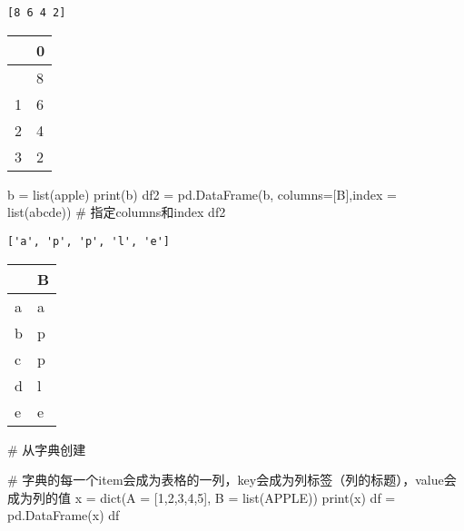 \documentclass[
  letterpaper,
  DIV=11,
  numbers=noendperiod]{scrreprt}
\newenvironment{Shaded}{\begin{snugshade}}{\end{snugshade}}
\newcommand{\BuiltInTok}[1]{\textcolor[rgb]{0.00,0.23,0.31}{#1}}
\newcommand{\CommentTok}[1]{\textcolor[rgb]{0.37,0.37,0.37}{#1}}
\newcommand{\DecValTok}[1]{\textcolor[rgb]{0.68,0.00,0.00}{#1}}
\newcommand{\NormalTok}[1]{\textcolor[rgb]{0.00,0.23,0.31}{#1}}
\newcommand{\OperatorTok}[1]{\textcolor[rgb]{0.37,0.37,0.37}{#1}}
\newcommand{\StringTok}[1]{\textcolor[rgb]{0.13,0.47,0.30}{#1}}
\begin{document}
\begin{verbatim}
[8 6 4 2]
\end{verbatim}

\begin{longtable}[]{@{}ll@{}}
\toprule\noalign{}
& 0 \\
\midrule\noalign{}
\endhead
\bottomrule\noalign{}
\endlastfoot
0 & 8 \\
1 & 6 \\
2 & 4 \\
3 & 2 \\
\end{longtable}

\begin{Shaded}
\begin{Highlighting}[]
\NormalTok{b }\OperatorTok{=} \BuiltInTok{list}\NormalTok{(}\StringTok{\textquotesingle{}apple\textquotesingle{}}\NormalTok{)}
\BuiltInTok{print}\NormalTok{(b)}
\NormalTok{df2 }\OperatorTok{=}\NormalTok{ pd.DataFrame(b, columns}\OperatorTok{=}\NormalTok{[}\StringTok{\textquotesingle{}B\textquotesingle{}}\NormalTok{],index }\OperatorTok{=} \BuiltInTok{list}\NormalTok{(}\StringTok{\textquotesingle{}abcde\textquotesingle{}}\NormalTok{)) }\CommentTok{\# 指定columns和index}
\NormalTok{df2}
\end{Highlighting}
\end{Shaded}

\begin{verbatim}
['a', 'p', 'p', 'l', 'e']
\end{verbatim}

\begin{longtable}[]{@{}ll@{}}
\toprule\noalign{}
& B \\
\midrule\noalign{}
\endhead
\bottomrule\noalign{}
\endlastfoot
a & a \\
b & p \\
c & p \\
d & l \\
e & e \\
\end{longtable}

\begin{Shaded}
\begin{Highlighting}[]
\CommentTok{\# 从字典创建}

\CommentTok{\# 字典的每一个item会成为表格的一列，key会成为列标签（列的标题），value会成为列的值}
\NormalTok{x }\OperatorTok{=} \BuiltInTok{dict}\NormalTok{(A }\OperatorTok{=}\NormalTok{ [}\DecValTok{1}\NormalTok{,}\DecValTok{2}\NormalTok{,}\DecValTok{3}\NormalTok{,}\DecValTok{4}\NormalTok{,}\DecValTok{5}\NormalTok{], B }\OperatorTok{=} \BuiltInTok{list}\NormalTok{(}\StringTok{\textquotesingle{}APPLE\textquotesingle{}}\NormalTok{))}
\BuiltInTok{print}\NormalTok{(x)}
\NormalTok{df }\OperatorTok{=}\NormalTok{ pd.DataFrame(x)}
\NormalTok{df }
\end{Highlighting}
\end{Shaded}
\end{document}
